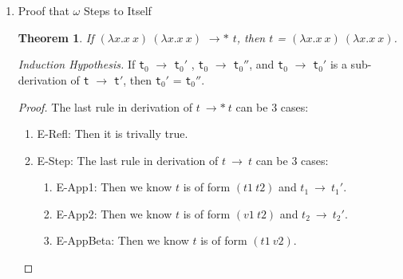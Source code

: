 \documentclass{article}
\newtheorem{thm}{Theorem}
\begin{document}
\begin{description}
\begin{enumerate}
\begin{proof}
\begin{enumerate}
        \item E-If: \verb|t|$_1$ must take a step to some \verb|t|$_1'$, and \verb|t| has the form
        \verb|if t|$_1$ \verb|then t|$_2$ \verb|else t|$_3$.
        The last rule in derivation of \verb|t| $\longrightarrow$ \verb|t|$''$ can be 3 cases:
          \begin{enumerate}
            \item E-IfTrue: \verb|t|$_1$ is \verb|true|, and values can't take a step.
            \item E-IfFalse: A similar argument holds.
            \item E-If: then \verb|t|$_1$ must take a step to some \verb|t|$_1''$. By the inductive hypothesis, since we know \verb|t|$_1$ steps to both \verb|t|$_1'$ and \verb|t|$_1''$,
            then \verb|t|$_1'$ and \verb|t|$_1''$ must be the same.
            \end{enumerate}
      \end{enumerate}
    \end{proof}

  \item{Proof that $\omega$ Steps to Itself}
    \begin{thm}If $(\lambda x.x\ x)\ (\lambda x.x\ x)$ $\longrightarrow*$ $t$, 
      then $t$ = $(\lambda x.x\ x)\ (\lambda x.x\ x)$.
    \end{thm}

    \textit{Induction Hypothesis.} If \verb|t|$_0$ $\longrightarrow$ \verb|t|$_0'$ , \verb|t|$_0$ $\longrightarrow$ \verb|t|$_0''$, and \verb|t|$_0$ $\longrightarrow$ \verb|t|$_0'$ is a sub-derivation of \verb|t| $\longrightarrow$ \verb|t|$'$, then \verb|t|$_0'$ = \verb|t|$_0''$.

    \begin{proof}
      The last rule in derivation of $t\ \longrightarrow*\ t$ can be 3 cases:
      \begin{enumerate}
        \item E-Refl: Then it is trivally true.

        \item E-Step:
            The last rule in derivation of $t\ \longrightarrow\ t$ can be 3 cases:
            \begin{enumerate}
            \item E-App1: Then we know $t$ is of form $(t1\ t2)$ and $t_1\ \longrightarrow\ t_1'$.
            \item E-App2: Then we know $t$ is of form $(v1\ t2)$ and $t_2\ \longrightarrow\ t_2'$.
            \item E-AppBeta: Then we know $t$ is of form $(t1\ v2)$. 


\end{enumerate}
\end{enumerate}
\end{proof}
\end{enumerate}
\end{description}
\end{document}
